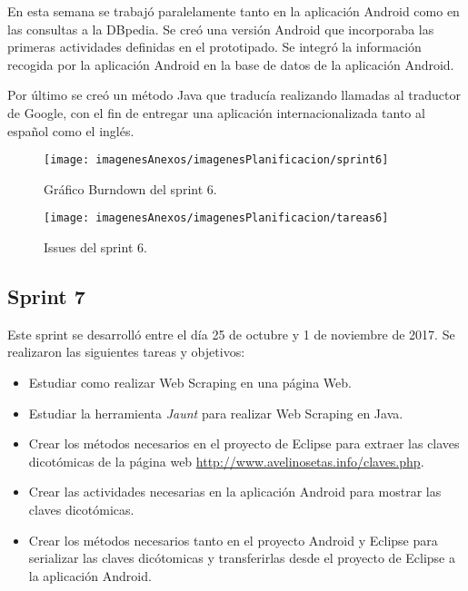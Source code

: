 En esta semana se trabajó paralelamente tanto en la aplicación Android como en las consultas a la DBpedia. Se creó una versión Android que incorporaba las primeras actividades definidas en el prototipado. Se integró la información recogida por la aplicación Android en la base de datos de la aplicación Android.

Por último se creó un método Java que traducía realizando llamadas al traductor de Google, con el fin de entregar una aplicación internacionalizada tanto al español como el inglés.

\begin{figure}[h]
    \begin{center}%
        \begin{center}%
          \texttt{[image: imagenesAnexos/imagenesPlanificacion/sprint6]}%
          \caption{Gráfico Burndown del sprint 6.}%
          \label{figSprint6}%
        \end{center}%
  	\end{center}%
\end{figure}%

\begin{figure}[h]
    \begin{center}%
        \begin{center}%
          \texttt{[image: imagenesAnexos/imagenesPlanificacion/tareas6]}%
          \caption{Issues del sprint 6.}%
          \label{figTareas6}%
        \end{center}%
  	\end{center}%
\end{figure}%
\newpage

\subsection{Sprint 7}

Este sprint se desarrolló entre el día 25 de octubre y 1 de noviembre de 2017. Se realizaron las siguientes tareas y objetivos:

\begin{itemize}
	\item Estudiar como realizar Web Scraping en una página Web.
	\item Estudiar la herramienta \textit{Jaunt} para realizar Web Scraping en Java.
	\item Crear los métodos necesarios en el proyecto de Eclipse para extraer las claves dicotómicas de la página web \url{http://www.avelinosetas.info/claves.php}.
	\item Crear las actividades necesarias en la aplicación Android para mostrar las claves dicotómicas.
	\item Crear los métodos necesarios tanto en el proyecto Android y Eclipse para serializar las claves dicótomicas y transferirlas desde el proyecto de Eclipse a la aplicación Android.
\end{itemize}

